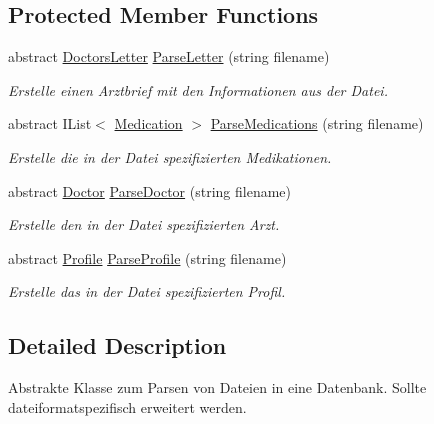 \subsection*{Protected Member Functions}
\begin{CompactItemize}
\item 
abstract \hyperlink{classmy_m_d_1_1_model_1_1_data_model_1_1_doctors_letter}{Doctors\-Letter} \hyperlink{classmy_m_d_1_1_model_1_1_parser_model_1_1_file_to_database_parser_d8ae1d1ef5060c24906a67b82f7b3329}{Parse\-Letter} (string filename)
\begin{CompactList}\small\item\em Erstelle einen Arztbrief mit den Informationen aus der Datei. \item\end{CompactList}\item 
abstract IList$<$ \hyperlink{classmy_m_d_1_1_model_1_1_data_model_1_1_medication}{Medication} $>$ \hyperlink{classmy_m_d_1_1_model_1_1_parser_model_1_1_file_to_database_parser_84eaf7d498558fe57b2f248968a439b4}{Parse\-Medications} (string filename)
\begin{CompactList}\small\item\em Erstelle die in der Datei spezifizierten Medikationen. \item\end{CompactList}\item 
abstract \hyperlink{classmy_m_d_1_1_model_1_1_data_model_1_1_doctor}{Doctor} \hyperlink{classmy_m_d_1_1_model_1_1_parser_model_1_1_file_to_database_parser_8f5b7fa31916486a50b050795daa395c}{Parse\-Doctor} (string filename)
\begin{CompactList}\small\item\em Erstelle den in der Datei spezifizierten Arzt. \item\end{CompactList}\item 
abstract \hyperlink{classmy_m_d_1_1_model_1_1_data_model_1_1_profile}{Profile} \hyperlink{classmy_m_d_1_1_model_1_1_parser_model_1_1_file_to_database_parser_3bb98e867ab361116982cfb17dfe8de9}{Parse\-Profile} (string filename)
\begin{CompactList}\small\item\em Erstelle das in der Datei spezifizierten Profil. \item\end{CompactList}\end{CompactItemize}


\subsection{Detailed Description}
Abstrakte Klasse zum Parsen von Dateien in eine Datenbank. Sollte dateiformatspezifisch erweitert werden. 




